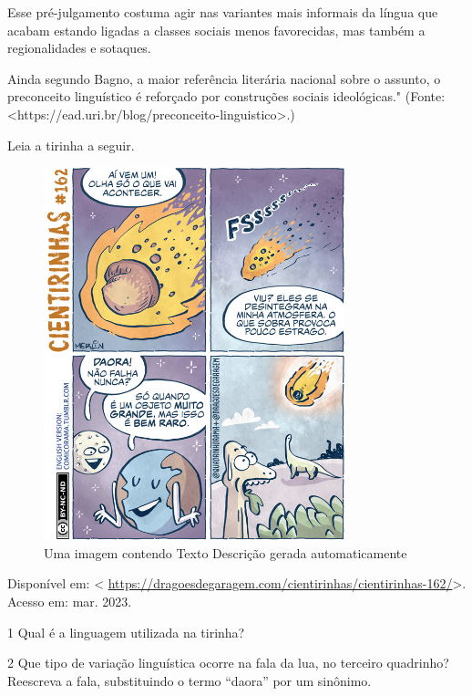 {{Esse pré-julgamento costuma agir nas variantes mais informais da língua
que acabam estando ligadas a classes sociais menos favorecidas, mas
também a regionalidades e sotaques.

Ainda segundo Bagno, a maior referência literária nacional sobre o
assunto, o preconceito linguístico é reforçado por construções sociais
ideológicas." (Fonte:
<https://ead.uri.br/blog/preconceito-linguistico>.)}

Leia a tirinha a seguir.

\begin{figure}
\centering
\includegraphics[width=3.45in,height=4.26179in]{./imgSAEB_6_POR/media/image32.jpeg}
\caption{Uma imagem contendo Texto Descrição gerada automaticamente}
\end{figure}

Disponível em: \textless{}
\url{https://dragoesdegaragem.com/cientirinhas/cientirinhas-162/}\textgreater.
Acesso em: mar. 2023.

\num{1} Qual é a linguagem utilizada na tirinha?



\num{2} Que tipo de variação linguística ocorre na fala da lua, no
terceiro quadrinho? Reescreva a fala, substituindo o termo ``daora'' por
um sinônimo.



}

